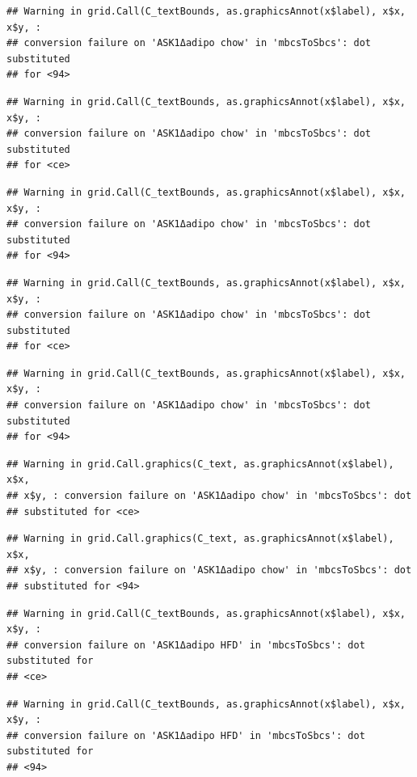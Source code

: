 \documentclass[]{book}
\begin{document}
\begin{verbatim}
## Warning in grid.Call(C_textBounds, as.graphicsAnnot(x$label), x$x, x$y, :
## conversion failure on 'ASK1Δadipo chow' in 'mbcsToSbcs': dot substituted
## for <94>
\end{verbatim}

\begin{verbatim}
## Warning in grid.Call(C_textBounds, as.graphicsAnnot(x$label), x$x, x$y, :
## conversion failure on 'ASK1Δadipo chow' in 'mbcsToSbcs': dot substituted
## for <ce>
\end{verbatim}

\begin{verbatim}
## Warning in grid.Call(C_textBounds, as.graphicsAnnot(x$label), x$x, x$y, :
## conversion failure on 'ASK1Δadipo chow' in 'mbcsToSbcs': dot substituted
## for <94>
\end{verbatim}

\begin{verbatim}
## Warning in grid.Call(C_textBounds, as.graphicsAnnot(x$label), x$x, x$y, :
## conversion failure on 'ASK1Δadipo chow' in 'mbcsToSbcs': dot substituted
## for <ce>
\end{verbatim}

\begin{verbatim}
## Warning in grid.Call(C_textBounds, as.graphicsAnnot(x$label), x$x, x$y, :
## conversion failure on 'ASK1Δadipo chow' in 'mbcsToSbcs': dot substituted
## for <94>
\end{verbatim}

\begin{verbatim}
## Warning in grid.Call.graphics(C_text, as.graphicsAnnot(x$label), x$x,
## x$y, : conversion failure on 'ASK1Δadipo chow' in 'mbcsToSbcs': dot
## substituted for <ce>
\end{verbatim}

\begin{verbatim}
## Warning in grid.Call.graphics(C_text, as.graphicsAnnot(x$label), x$x,
## x$y, : conversion failure on 'ASK1Δadipo chow' in 'mbcsToSbcs': dot
## substituted for <94>
\end{verbatim}

\begin{verbatim}
## Warning in grid.Call(C_textBounds, as.graphicsAnnot(x$label), x$x, x$y, :
## conversion failure on 'ASK1Δadipo HFD' in 'mbcsToSbcs': dot substituted for
## <ce>
\end{verbatim}

\begin{verbatim}
## Warning in grid.Call(C_textBounds, as.graphicsAnnot(x$label), x$x, x$y, :
## conversion failure on 'ASK1Δadipo HFD' in 'mbcsToSbcs': dot substituted for
## <94>
\end{verbatim}
\end{document}
